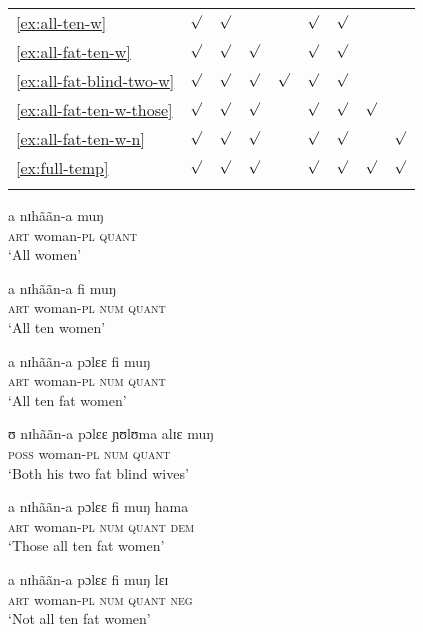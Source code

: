 \begin{exe}
\begin{exe}
\begin{exe}
{\begin{exe}
\begin{exe}
\begin{exe}
\begin{exe}
\begin{exe}
\begin{exe}
\begin{exe}
\begin{xlist}
\begin{exe}
\begin{exe}
\begin{exe}
\begin{table}[!h]
\begin{tabular}{lcccccccc}
\ref{ex:all-ten-w}&$\surd$&$\surd$&&&$\surd$&$\surd$&&\\

\ref{ex:all-fat-ten-w}&$\surd$&$\surd$&$\surd$&&$\surd$&$\surd$&&\\

\ref{ex:all-fat-blind-two-w}
&$\surd$&$\surd$&$\surd$&$\surd$&$\surd$&$\surd$&&\\

\ref{ex:all-fat-ten-w-those}
&$\surd$&$\surd$&$\surd$&&$\surd$&$\surd$&$\surd$&\\

\ref{ex:all-fat-ten-w-n}
&$\surd$&$\surd$&$\surd$&&$\surd$&$\surd$&&$\surd$\\

\ref{ex:full-temp} &$\surd$&$\surd$&$\surd$&&$\surd$&$\surd$&$\surd$&$\surd$\\
\lspbottomrule
  \end{tabular}
\end{table}

\ea
  \ea\label{ex:all-w}
\gll a nɪhããn-a muŋ\\
\textsc{art} {woman-\textsc{pl}} \textsc{quant}\\
\glt `All women'

 \ex\label{ex:all-ten-w}
\gll a nɪhããn-a fi muŋ\\
\textsc{art} {woman-\textsc{pl}} \textsc{num} \textsc{quant}\\
\glt `All ten women'


\ex\label{ex:all-fat-ten-w}
\gll a nɪhããn-a pɔlɛɛ fi muŋ\\
\textsc{art} {woman-\textsc{pl}} {\qual} \textsc{num} \textsc{quant}\\
\glt `All ten fat women'

\ex\label{ex:all-fat-blind-two-w}
\gll ʊ nɪhããn-a  pɔlɛɛ ɲʊlʊma  alɪɛ muŋ\\
\textsc{poss} {woman-\textsc{pl}} {\qual}  {\qual} \textsc{num} 
\textsc{quant}\\
\glt `Both his two fat blind wives'

\ex\label{ex:all-fat-ten-w-those}
\gll a nɪhããn-a pɔlɛɛ fi muŋ  hama\\
\textsc{art} {woman-\textsc{pl}} {\qual} \textsc{num} \textsc{quant}
\textsc{dem}\\
\glt `Those all ten fat women'


\ex\label{ex:all-fat-ten-w-n}
\gll a nɪhããn-a pɔlɛɛ fi muŋ  lɛɪ\\
\textsc{art} {woman-\textsc{pl}} {\qual} \textsc{num} \textsc{quant}
\textsc{neg}\\
\glt `Not all ten fat women'


\end{exe}
\end{exe}
\end{exe}
\end{xlist}
\end{exe}
\end{exe}
\end{exe}
\end{exe}
\end{exe}
\end{exe}
\end{exe}}
\end{exe}
\end{exe}
\end{exe}
